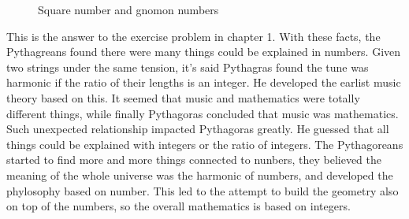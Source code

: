 \documentclass{article}
\begin{document}
\begin{figure}[htbp]
\centering
{}
\caption{Square number and gnomon numbers}
\label{fig:square-num}
\end{figure}

This is the answer to the exercise problem in chapter 1. With these facts, the Pythagreans found there were many things could be explained in numbers. Given two strings under the same tension, it's said Pythagras found the tune was harmonic if the ratio of their lengths is an integer. He developed the earlist music theory based on this. It seemed that music and mathematics were totally different things, while finally Pythagoras concluded that music was mathematics. Such unexpected relationship impacted Pythagoras greatly. He guessed that all things could be explained with integers or the ratio of integers. The Pythagoreans started to find more and more things connected to nunbers, they believed the meaning of the whole universe was the harmonic of numbers, and developed the phylosophy based on number. This led to the attempt to build the geometry also on top of the numbers, so the overall mathematics is based on integers.
\end{document}
